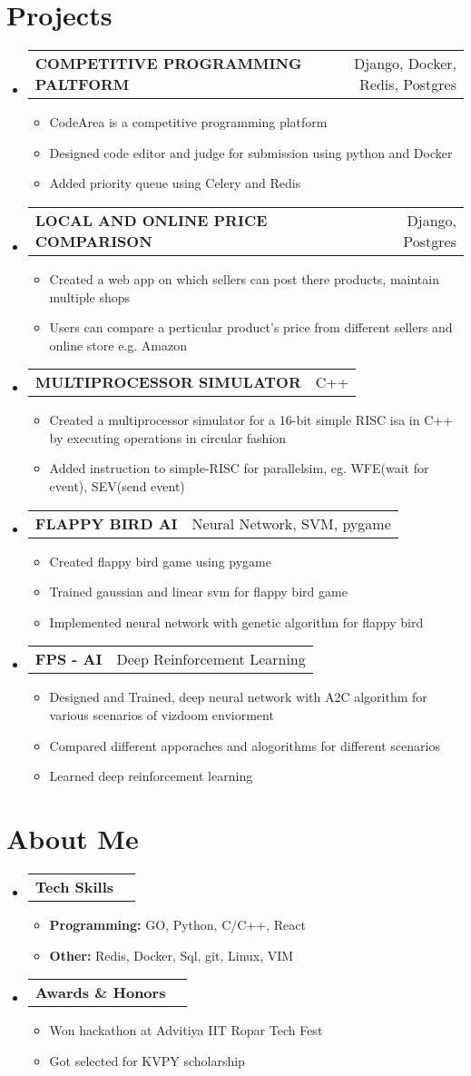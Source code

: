 \documentclass[letterpaper,11pt]{article}
\makeatletter
\newcommand{\resumeItem}[2]{
  \item\small{
    \textbf{#1:}{ #2 \vspace{-2pt}}
  }
}
\newcommand{\resumeSimpleItem}[1]{
    \item\small{
        {#1}
    }
}
\newcommand{\resumeSimpleSubheading}[2]{
  \vspace{-1pt}\item
    \begin{tabular*}{0.97\textwidth}[t]{l@{\extracolsep{\fill}}r}
      \textbf{#1} & #2 \\
    \end{tabular*}\vspace{-5pt}
}
\newcommand{\resumeListTitle}[1]{
    \vspace{-1pt}\item
    \begin{tabular*}{0.97\textwidth}[t]{l@{\extracolsep{\fill}}r}
        \textbf{#1} \\
    \end{tabular*}\vspace{-5pt}
}
\newcommand{\resumeSubHeadingListStart}{\begin{itemize}[leftmargin=*]}
\newcommand{\resumeSubHeadingListEnd}{\end{itemize}}
\newcommand{\resumeItemListStart}{\begin{itemize}}
\newcommand{\resumeItemListEnd}{\end{itemize}\vspace{-5pt}}
\makeatother
\begin{document}
\section{Projects}
  \resumeSubHeadingListStart
    \resumeSimpleSubheading
    {COMPETITIVE PROGRAMMING PALTFORM}{Django, Docker, Redis, Postgres}
    \resumeItemListStart
      \resumeSimpleItem {CodeArea is a competitive programming platform}
      \resumeSimpleItem {Designed code editor and judge for submission using python and Docker}
      \resumeSimpleItem {Added priority queue using Celery and Redis}
    \resumeItemListEnd
    \resumeSimpleSubheading
    {LOCAL AND ONLINE PRICE COMPARISON}{Django, Postgres}
    \resumeItemListStart
        \resumeSimpleItem {Created a web app on which sellers can post there products, maintain multiple shops}
        \resumeSimpleItem {Users can compare a perticular product's price from different sellers and online store e.g. Amazon}
    \resumeItemListEnd
    \resumeSimpleSubheading
    {MULTIPROCESSOR SIMULATOR}{C++}
    \resumeItemListStart
      \resumeSimpleItem {Created a multiprocessor simulator for a 16-bit simple RISC isa in C++ by executing operations in circular fashion}
      \resumeSimpleItem {Added instruction to simple-RISC for parallelsim, eg. WFE(wait for event), SEV(send event)}
    \resumeItemListEnd
    \resumeSimpleSubheading
    {FLAPPY BIRD AI} {Neural Network, SVM, pygame}
    \resumeItemListStart
      \resumeSimpleItem {Created flappy bird game using pygame}
      \resumeSimpleItem {Trained gaussian and linear svm for flappy bird game}
      \resumeSimpleItem {Implemented neural network with genetic algorithm for flappy bird}
    \resumeItemListEnd
    \resumeSimpleSubheading
    {FPS - AI} {Deep Reinforcement Learning}
    \resumeItemListStart
      \resumeSimpleItem {Designed and Trained, deep neural network with A2C algorithm for various scenarios of vizdoom enviorment}
      \resumeSimpleItem {Compared different apporaches and alogorithms for different scenarios}
      \resumeSimpleItem {Learned deep reinforcement learning}
    \resumeItemListEnd
    \resumeSubHeadingListEnd



\section{About Me}
 \resumeSubHeadingListStart
    \resumeListTitle{Tech Skills}
        \resumeItemListStart
            \resumeItem{Programming}
            {GO, Python, C/C++, React}
            \resumeItem{Other}
            {Redis, Docker, Sql, git, Linux, VIM}
        \resumeItemListEnd
    \resumeListTitle{Awards \& Honors}
        \resumeItemListStart
            \resumeSimpleItem{Won hackathon at Advitiya IIT Ropar Tech Fest}
            \resumeSimpleItem{Got selected for KVPY scholarship}
        \resumeItemListEnd
 \resumeSubHeadingListEnd
 
\end{document}
